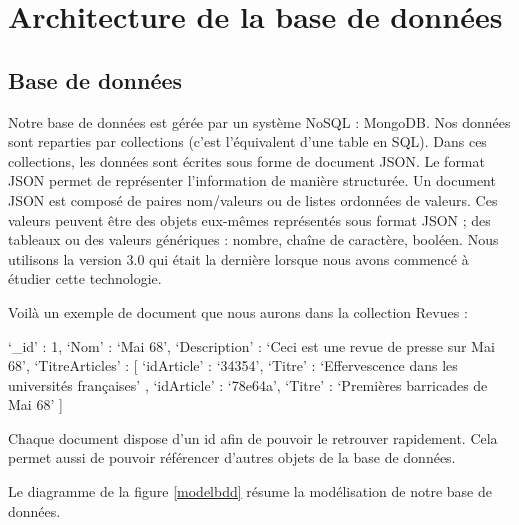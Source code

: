 \newpage
\section{Architecture de la base de données}
\label{sec:bdd}

\subsection{Base de données}
\label{subsec:mongo}

Notre base de données est gérée par un système NoSQL : MongoDB. Nos données sont reparties par collections (c’est l’équivalent d’une table en SQL). Dans ces collections, les données sont écrites sous forme de document JSON. Le format JSON permet de représenter l’information de manière structurée. Un document JSON est composé de paires nom/valeurs ou de listes ordonnées de valeurs. Ces valeurs peuvent être des objets eux-mêmes représentés sous format JSON ; des tableaux ou des valeurs génériques : nombre, chaîne de caractère, booléen. Nous utilisons la version 3.0 qui était la dernière lorsque nous avons commencé à étudier cette technologie.  


Voilà un exemple de document que nous aurons dans la collection Revues : 


\begin{verbatimtab}[3]
{
	‘_id’ : 1,
	‘Nom’ : ‘Mai 68’,
	‘Description’ : ‘Ceci est une revue de presse sur Mai 68’,
	‘TitreArticles’ : [ 
		{ ‘idArticle’ : ‘34354’, ‘Titre’ : ‘Effervescence dans les universités françaises’ },
		{ ‘idArticle’ : ‘78e64a’,  ‘Titre’ :	‘Premières barricades de Mai 68’ }
  ]
}
\end{verbatimtab}

Chaque document dispose d’un id afin de pouvoir le retrouver rapidement. Cela permet aussi de pouvoir référencer d’autres objets de la base de données. 

Le diagramme de la figure \ref{modelbdd} résume la modélisation de notre base de données.


